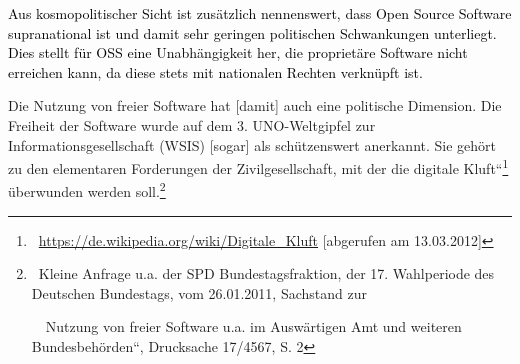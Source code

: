 \documentclass[a4paper]{article}
\begin{document}
\bigskip

{
\textcolor{black}{Aus}\textcolor{black}{
}\textcolor{black}{kosmopolitischer}\textcolor{black}{
}\textcolor{black}{Sicht}\textcolor{black}{
}\textcolor{black}{ist}\textcolor{black}{
}\textcolor{black}{zus\"atzlich}\textcolor{black}{
}\textcolor{black}{nennenswert,}\textcolor{black}{
}\textcolor{black}{dass}\textcolor{black}{
}\textcolor{black}{Open}\textcolor{black}{
}\textcolor{black}{Source}\textcolor{black}{
}\textcolor{black}{Software}\textcolor{black}{
}\textcolor{black}{supranational}\textcolor{black}{
}\textcolor{black}{ist}\textcolor{black}{
}\textcolor{black}{und}\textcolor{black}{
}\textcolor{black}{damit}\textcolor{black}{
}\textcolor{black}{sehr}\textcolor{black}{
}\textcolor{black}{geringen}\textcolor{black}{
}\textcolor{black}{politischen}\textcolor{black}{
}\textcolor{black}{Schwankungen}\textcolor{black}{
}\textcolor{black}{unterliegt.}\textcolor{black}{
}\textcolor{black}{Dies}\textcolor{black}{
}\textcolor{black}{stellt}\textcolor{black}{
}\textcolor{black}{f\"ur}\textcolor{black}{
}\textcolor{black}{OSS}\textcolor{black}{
}\textcolor{black}{eine}\textcolor{black}{
}\textcolor{black}{Unabh\"angigkeit}\textcolor{black}{
}\textcolor{black}{her,}\textcolor{black}{
}\textcolor{black}{die}\textcolor{black}{
}\textcolor{black}{propriet\"are}\textcolor{black}{
}\textcolor{black}{Software}\textcolor{black}{
}\textcolor{black}{nicht}\textcolor{black}{
}\textcolor{black}{erreichen}\textcolor{black}{
}\textcolor{black}{kann,}\textcolor{black}{
}\textcolor{black}{da}\textcolor{black}{
}\textcolor{black}{diese}\textcolor{black}{
}\textcolor{black}{stets}\textcolor{black}{
}\textcolor{black}{mit}\textcolor{black}{
}\textcolor{black}{nationalen}\textcolor{black}{
}\textcolor{black}{Rechten}\textcolor{black}{
}\textcolor{black}{verkn\"upft}\textcolor{black}{
}\textcolor{black}{ist.}}

{
{\guillemotright}Die Nutzung von freier Software hat [damit] auch eine
politische Dimension. Die Freiheit der Software wurde auf dem 3.
UNO-Weltgipfel zur Informationsgesellschaft (WSIS) [sogar] als
sch\"utzenswert anerkannt. Sie geh\"ort zu den elementaren Forderungen
der Zivilgesellschaft, mit der die {\quotedblbase}digitale
Kluft{\textquotedblleft}\footnote{\ \url{https://de.wikipedia.org/wiki/Digitale_Kluft}
[abgerufen am 13.03.2012]} \"uberwunden werden
soll.{\guillemotleft}\footnote{\ Kleine Anfrage u.a. der SPD
Bundestagsfraktion, der 17. Wahlperiode des Deutschen Bundestags, vom
26.01.2011, {\quotedblbase}Sachstand zur\par \ \ Nutzung von freier
Software u.a. im Ausw\"artigen Amt und weiteren
Bundesbeh\"orden{\textquotedblleft}, Drucksache 17/4567, S. 2}}
\end{document}
